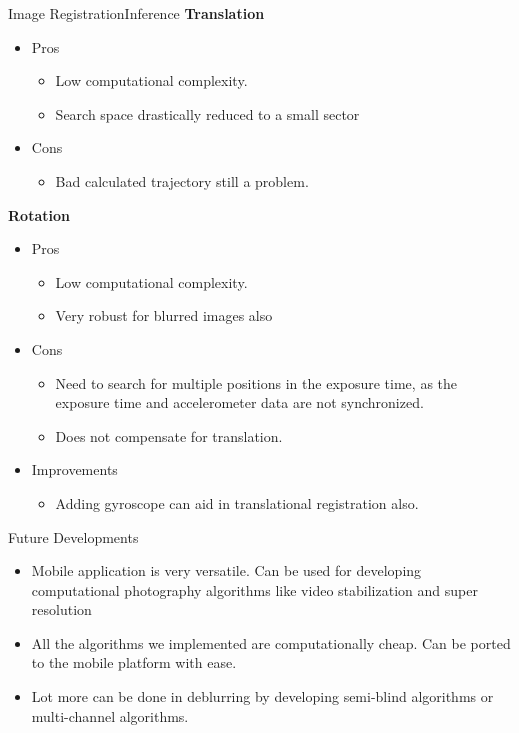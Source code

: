 \documentclass{beamer}
\begin{document}
\begin{frame}{Image Registration}{Inference}
\textbf{Translation}
\begin{itemize}
	\item Pros
		\begin{itemize}
			\item Low computational complexity.
			\item Search space drastically reduced to a small sector
		\end{itemize}
	\item Cons
		\begin{itemize}
			\item Bad calculated trajectory still a problem.
		\end{itemize}
\end{itemize}
\vspace{0.2cm}
\textbf{Rotation}
\begin{itemize}
	\item Pros
		\begin{itemize}
			\item Low computational complexity.
			\item Very robust for blurred images also
		\end{itemize}
	\item Cons
		\begin{itemize}
			\item Need to search for multiple positions in the exposure time,
			as the exposure time and accelerometer data are not synchronized.
			\item Does not compensate for translation.
		\end{itemize}
	\item Improvements
		\begin{itemize}
			\item Adding gyroscope can aid in translational registration also.
		\end{itemize}
\end{itemize}
\end{frame}

\begin{frame}{Future Developments}
\begin{itemize}
	\item Mobile application is very versatile. Can be used for developing
	computational photography algorithms like video stabilization and super 
	resolution
	\item All the algorithms we implemented are computationally cheap. Can be
	ported to the mobile platform with ease.
	\item Lot more can be done in deblurring by developing semi-blind algorithms
	or multi-channel algorithms. 
\end{itemize}
\end{frame}
\end{document}
